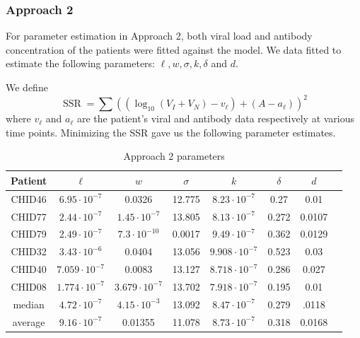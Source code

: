 \documentclass[]{elsarticle}
\newcommand{\SSR}{\operatorname{SSR}}
\theoremstyle{definition}
\begin{document}
\subsubsection{Approach 2}
For parameter estimation in Approach 2, both viral load and antibody concentration of the patients were fitted against the model. We data fitted to estimate the following parameters: $\ell, w, \sigma, k, \delta$ and $d$.

We define
$$\SSR = \sum \left((\log_{10} (V_I +V_N)-v_\ell)+(A-a_\ell) \right)^2$$
where $v_\ell$ and $a_\ell$ are the patient's viral and antibody data respectively at various time points. Minimizing the SSR gave us the following parameter estimates.



\begin{centering}
\begin{table}[H]
\begin{tabular}{|c|c|c|c|c|c|c|c|}
\hline
Patient & $\ell$ & $w$ & $\sigma$ & $k$ & $\delta $ & $d$ \\ \hline
CHID46 &$6.95 \cdot 10^{-7}$&0.0326	&	12.775&	 $8.23\cdot 10^{-7}$&  0.27&	0.01	\\ \hline
CHID77 & $2.44\cdot 10^{-7}$	&$1.45\cdot 10^{-7}$&	13.805&	$8.13\cdot 10^{-7}$&	0.272&		0.0107\\ \hline
CHID79 & $2.49 \cdot 10^{-7}$ &	$7.3 \cdot 10^{-10}$ &	0.0017&	$9.49 \cdot 10^{-7}$&	0.362&		0.0129	\\
\hline
CHID32 &$3.43 \cdot 10^{-6}$	&0.0404	&13.056	&$9.908 \cdot 10^{-7}$&	0.523	&	0.03	 \\ \hline
CHID40 & $7.059  \cdot 10^{-7}$&	0.0083	&13.127&	$8.718 \cdot 10^{-7}$&	0.286&		0.027 \\ \hline
CHID08 &$1.774 \cdot 10^{-7}$ &$3.679 \cdot 10^{-7}$&	13.702&	$7.918 \cdot 10^{-7}$ &	0.195	&0.01	\\ \hline
median&$4.72 \cdot 10^{-7}$	&$4.15  \cdot 10^{-3}$&	13.092&	$8.47  \cdot 10^{-7}$&	0.279&	.0118	\\ \hline
average &$9.16  \cdot 10^{-7}$&	0.01355&	11.078&	$8.73  \cdot 10^{-7}$&	0.318&		0.0168	\\ \hline
\end{tabular}
\caption{Approach 2 parameters}
\label{table:ta}
\end{table}
\end{centering}
\end{document}
